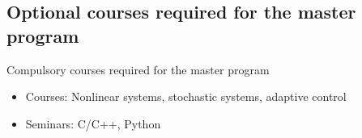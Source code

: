 \documentclass{beamer}
\begin{document}
\subsection{Optional courses required for the master program}
\begin{frame}{Compulsory courses required for the master program}
	\begin{itemize}
		\item Courses: Nonlinear systems, stochastic systems, adaptive control
		\item Seminars: C/C++, Python
	\end{itemize}
\end{frame}
\appendix
\begin{frame}{}
\end{frame}
\end{document}
